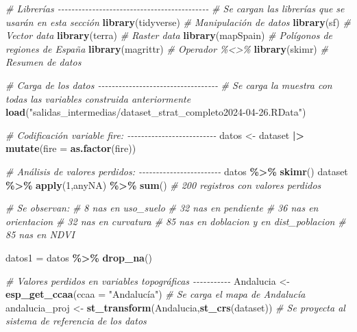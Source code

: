 \documentclass[12pt,a4paper,]{book}
\newenvironment{Shaded}{\begin{snugshade}}{\end{snugshade}}
\newcommand{\AttributeTok}[1]{\textcolor[rgb]{0.13,0.29,0.53}{#1}}
\newcommand{\CommentTok}[1]{\textcolor[rgb]{0.56,0.35,0.01}{\textit{#1}}}
\newcommand{\DecValTok}[1]{\textcolor[rgb]{0.00,0.00,0.81}{#1}}
\newcommand{\FunctionTok}[1]{\textcolor[rgb]{0.13,0.29,0.53}{\textbf{#1}}}
\newcommand{\NormalTok}[1]{#1}
\newcommand{\OtherTok}[1]{\textcolor[rgb]{0.56,0.35,0.01}{#1}}
\newcommand{\SpecialCharTok}[1]{\textcolor[rgb]{0.81,0.36,0.00}{\textbf{#1}}}
\newcommand{\StringTok}[1]{\textcolor[rgb]{0.31,0.60,0.02}{#1}}
\numberwithin{dummy}{section}
\theoremstyle{ocrenumbox}
\theoremstyle{blacknumex}
\theoremstyle{blacknumbox}
\theoremstyle{ocrenum}
\theoremstyle{ocrenum}
\begin{document}
\begin{Shaded}
\begin{Highlighting}[]
\CommentTok{\# Librerías {-}{-}{-}{-}{-}{-}{-}{-}{-}{-}{-}{-}{-}{-}{-}{-}{-}{-}{-}{-}{-}{-}{-}{-}{-}{-}{-}{-}{-}{-}{-}{-}{-}{-}{-}{-}{-}{-}{-}{-}{-}{-}{-}{-}}
\CommentTok{\# Se cargan las librerías que se usarán en esta sección}
\FunctionTok{library}\NormalTok{(tidyverse) }\CommentTok{\# Manipulación de datos }
\FunctionTok{library}\NormalTok{(sf) }\CommentTok{\# Vector data}
\FunctionTok{library}\NormalTok{(terra) }\CommentTok{\# Raster data}
\FunctionTok{library}\NormalTok{(mapSpain) }\CommentTok{\# Polígonos de regiones de España}
\FunctionTok{library}\NormalTok{(magrittr) }\CommentTok{\# Operador \%\textless{}\textgreater{}\% }
\FunctionTok{library}\NormalTok{(skimr) }\CommentTok{\# Resumen de datos}

\CommentTok{\# Carga de los datos {-}{-}{-}{-}{-}{-}{-}{-}{-}{-}{-}{-}{-}{-}{-}{-}{-}{-}{-}{-}{-}{-}{-}{-}{-}{-}{-}{-}{-}{-}{-}{-}{-}{-}{-}}
\CommentTok{\# Se carga la muestra con todas las variables construida anteriormente}
\FunctionTok{load}\NormalTok{(}\StringTok{"salidas\_intermedias/dataset\_strat\_completo2024{-}04{-}26.RData"}\NormalTok{)}


\CommentTok{\# Codificación variable fire: {-}{-}{-}{-}{-}{-}{-}{-}{-}{-}{-}{-}{-}{-}{-}{-}{-}{-}{-}{-}{-}{-}{-}{-}{-}{-}}
\NormalTok{datos }\OtherTok{\textless{}{-}}\NormalTok{ dataset }\SpecialCharTok{|\textgreater{}} 
  \FunctionTok{mutate}\NormalTok{(}\AttributeTok{fire =} \FunctionTok{as.factor}\NormalTok{(fire))}

\CommentTok{\# Análisis de valores perdidos: {-}{-}{-}{-}{-}{-}{-}{-}{-}{-}{-}{-}{-}{-}{-}{-}{-}{-}{-}{-}{-}{-}{-}{-}}
\NormalTok{datos }\SpecialCharTok{\%\textgreater{}\%} \FunctionTok{skimr}\NormalTok{()}
\NormalTok{dataset }\SpecialCharTok{\%\textgreater{}\%} \FunctionTok{apply}\NormalTok{(}\DecValTok{1}\NormalTok{,anyNA) }\SpecialCharTok{\%\textgreater{}\%} \FunctionTok{sum}\NormalTok{() }\CommentTok{\# 200 registros con valores perdidos}

\CommentTok{\# Se observan:}
\CommentTok{\#   8 nas en uso\_suelo}
\CommentTok{\#   32 nas en pendiente}
\CommentTok{\#   36 nas en orientacion}
\CommentTok{\#   32 nas en curvatura}
\CommentTok{\#   85 nas en doblacion y en dist\_poblacion}
\CommentTok{\#   85 nas en NDVI}

\NormalTok{datos1 }\OtherTok{=}\NormalTok{ datos }\SpecialCharTok{\%\textgreater{}\%} \FunctionTok{drop\_na}\NormalTok{()}

\CommentTok{\# Valores perdidos en variables topográficas {-}{-}{-}{-}{-}{-}{-}{-}{-}{-}{-}}
\NormalTok{Andalucia }\OtherTok{\textless{}{-}} \FunctionTok{esp\_get\_ccaa}\NormalTok{(}\AttributeTok{ccaa =} \StringTok{"Andalucía"}\NormalTok{) }\CommentTok{\# Se carga el mapa de Andalucía}
\NormalTok{andalucia\_proj }\OtherTok{\textless{}{-}} \FunctionTok{st\_transform}\NormalTok{(Andalucia,}\FunctionTok{st\_crs}\NormalTok{(dataset)) }\CommentTok{\# Se proyecta al sistema de referencia de los datos}


\end{Highlighting}
\end{Shaded}
\end{document}
